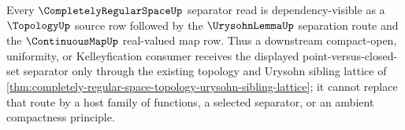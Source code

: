 Every $\CompletelyRegularSpaceUp$ separator read is dependency-visible as a $\TopologyUp$ source row followed by the $\UrysohnLemmaUp$ separation route and the $\ContinuousMapUp$ real-valued map row. Thus a downstream compact-open, uniformity, or Kelleyfication consumer receives the displayed point-versus-closed-set separator only through the existing topology and Urysohn sibling lattice of \autoref{thm:completely-regular-space-topology-urysohn-sibling-lattice}; it cannot replace that route by a host family of functions, a selected separator, or an ambient compactness principle.
